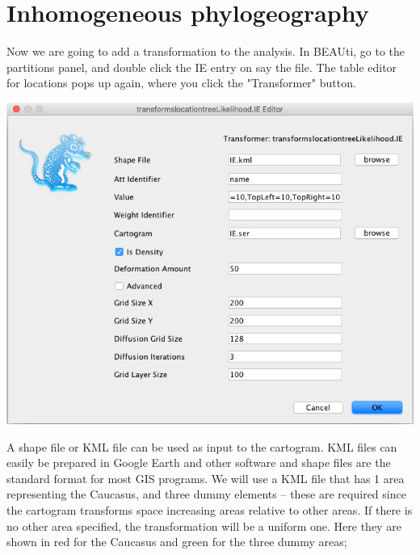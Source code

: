 \documentclass{article}
\begin{document}
\section*{Inhomogeneous phylogeography}

Now we are going to add a transformation to the analysis. In BEAUti, go to the partitions panel, and double click the IE entry on say the file. The table editor for locations pops up again, where you click the "Transformer" button.

\begin{center}
\includegraphics[scale=0.4]{figures/BEAUti_transform8}
\end{center}

A shape file or KML file can be used as input to the cartogram. KML files can easily be prepared in Google Earth and other software and shape files are the standard format for most GIS programs. We will use a KML file that has 1 area representing the Caucasus, and three dummy elements -- these are required since the cartogram transforms space increasing areas relative to other areas. If there is no other area specified, the transformation will be a uniform one. Here they are shown in red for the Caucasus and green for the three dummy areas;
\end{document}
